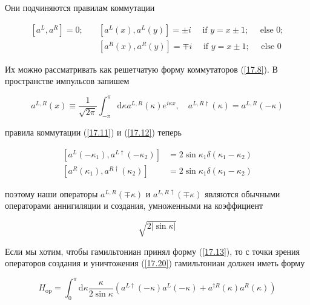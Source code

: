 \documentclass[main.tex]{subfiles}
\begin{document}
Они подчиняются правилам коммутации

\begin{equation}\label{17.17}
	\begin{aligned}\left[a^{L}, a^{R}\right]=0 ; \quad &\left[a^{L}(x), a^{L}(y)\right]=\pm i \quad \text { if } y=x \pm 1 ; \quad \text { else } 0 ; \\ &\left[a^{R}(x), a^{R}(y)\right]=\mp i \quad \text { if } y=x \pm 1 ; \quad \text { else } 0 \end{aligned}
\end{equation}

Их можно рассматривать как решетчатую форму коммутаторов (\ref{17.8}). В пространстве импульсов запишем

\begin{equation}\label{17.19}
	a^{L, R}(x) \equiv \frac{1}{\sqrt{2 \pi}} \int_{-\pi}^{\pi} \mathrm{d} \kappa a^{L, R}(\kappa) e^{i \kappa x}, \quad a^{L, R \dagger}(\kappa)=a^{L, R}(-\kappa)
\end{equation}

правила коммутации (\ref{17.11}) и (\ref{17.12}) теперь

\begin{equation}\label{17.20}
	\begin{aligned}\left[a^{L}\left(-\kappa_{1}\right), a^{L \dagger}\left(-\kappa_{2}\right)\right] &=2 \sin \kappa_{1} \delta\left(\kappa_{1}-\kappa_{2}\right) \\\left[a^{R}\left(\kappa_{1}\right), a^{R \dagger}\left(\kappa_{2}\right)\right] &=2 \sin \kappa_{1} \delta\left(\kappa_{1}-\kappa_{2}\right) \end{aligned}
\end{equation}

поэтому наши операторы $a^{L, R}(\mp \kappa)$ и $a^{L, R \uparrow}(\mp \kappa)$ являются обычными операторами аннигиляции и создания, умноженными на коэффициент

\begin{equation}\label{17.22}
\sqrt{2|\sin \kappa|}
\end{equation}

Если мы хотим, чтобы гамильтониан принял форму (\ref{17.13}), то с точки зрения операторов создания и уничтожения (\ref{17.20}) гамильтониан должен иметь форму

\begin{equation}\label{17.23}
H_{\mathrm{op}}=\int_{0}^{\pi} \mathrm{d} \kappa \frac{\kappa}{2 \sin \kappa}\left(a^{L \dagger}(-\kappa) a^{L}(-\kappa)+a^{\dagger R}(\kappa) a^{R}(\kappa)\right)
\end{equation}
\end{document}
